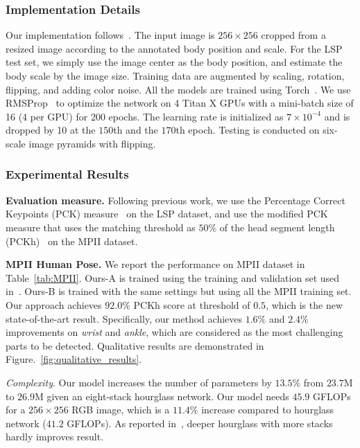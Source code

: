 \documentclass[10pt,twocolumn,letterpaper]{article}
\newcommand{\smalltitle}[1]{\vspace{0.2em}\noindent \textbf{{#1}}}
\begin{document}
\subsubsection{Implementation Details}
Our implementation follows~\cite{newell2016stacked}. The input image is $256\times 256$ cropped from a resized image according to the annotated body position and scale. 
For the LSP test set, we simply use the image center as the body position, and estimate the body scale by the image size. 
Training data are augmented by scaling, rotation, flipping, and adding color noise. 
All the models are trained using Torch~\cite{collobert2011torch7}. 
We use RMSProp~\cite{tieleman2012lecture} to optimize the network on 4 Titan X GPUs with a mini-batch size of 16 (4 per GPU) for 200 epochs. The learning rate is initialized as $7\times10^{-4}$ and is dropped by 10 at the $150$th and the $170$th epoch. Testing is conducted on six-scale image pyramids with flipping. 

\subsubsection{Experimental Results}

\smalltitle{Evaluation measure.} Following previous work, we use the Percentage Correct Keypoints (PCK) measure~\cite{yang2013articulated} on the LSP dataset, and use the modified PCK measure that uses the matching threshold as $50\%$ of the head segment length (PCKh)~\cite{andriluka20142d} on the MPII dataset.

\smalltitle{MPII Human Pose.} 
We report the performance on MPII dataset in Table~\ref{tab:MPII}. 
Ours-A is trained using the training and validation set used in~\cite{tompson2015efficient}. 
Ours-B is trained with the same settings but using all the MPII training set. 
Our approach achieves $92.0\%$ PCKh score at threshold of $0.5$, which is the new state-of-the-art result. 
Specifically, our method achieves $1.6\%$ and $2.4\%$ improvements on \textit{wrist} and \textit{ankle}, which are considered as the most challenging parts to be detected. 
Qualitative results are demonstrated in Figure.~\ref{fig:qualitative_results}.

\textit{Complexity}. 
Our model increases the number of parameters by $13.5\%$ from  $23.7$M  to $26.9$M  given an eight-stack hourglass network. 
Our model needs $45.9$ GFLOPs for a $256\times256$ RGB image, which is a $11.4\%$ increase compared to hourglass network ($41.2$ GFLOPs). 
As reported in~\cite{newell2016stacked}, deeper hourglass with more stacks hardly improves result.
\end{document}

